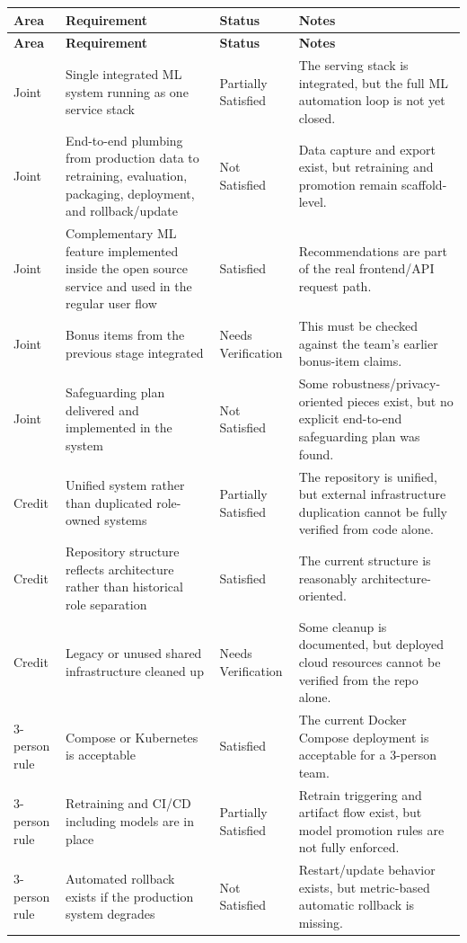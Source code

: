 \documentclass[11pt,a4paper]{article}
\begin{document}
\begin{longtable}{P{2.2cm}P{5.3cm}P{2.4cm}P{4.6cm}}
\toprule
\textbf{Area} & \textbf{Requirement} & \textbf{Status} & \textbf{Notes} \\
\midrule
\endfirsthead
\toprule
\textbf{Area} & \textbf{Requirement} & \textbf{Status} & \textbf{Notes} \\
\midrule
\endhead
Joint & Single integrated ML system running as one service stack & Partially Satisfied & The serving stack is integrated, but the full ML automation loop is not yet closed. \\
Joint & End-to-end plumbing from production data to retraining, evaluation, packaging, deployment, and rollback/update & Not Satisfied & Data capture and export exist, but retraining and promotion remain scaffold-level. \\
Joint & Complementary ML feature implemented inside the open source service and used in the regular user flow & Satisfied & Recommendations are part of the real frontend/API request path. \\
Joint & Bonus items from the previous stage integrated & Needs Verification & This must be checked against the team's earlier bonus-item claims. \\
Joint & Safeguarding plan delivered and implemented in the system & Not Satisfied & Some robustness/privacy-oriented pieces exist, but no explicit end-to-end safeguarding plan was found. \\
Credit & Unified system rather than duplicated role-owned systems & Partially Satisfied & The repository is unified, but external infrastructure duplication cannot be fully verified from code alone. \\
Credit & Repository structure reflects architecture rather than historical role separation & Satisfied & The current structure is reasonably architecture-oriented. \\
Credit & Legacy or unused shared infrastructure cleaned up & Needs Verification & Some cleanup is documented, but deployed cloud resources cannot be verified from the repo alone. \\
3-person rule & Compose or Kubernetes is acceptable & Satisfied & The current Docker Compose deployment is acceptable for a 3-person team. \\
3-person rule & Retraining and CI/CD including models are in place & Partially Satisfied & Retrain triggering and artifact flow exist, but model promotion rules are not fully enforced. \\
3-person rule & Automated rollback exists if the production system degrades & Not Satisfied & Restart/update behavior exists, but metric-based automatic rollback is missing. \\

\end{longtable}
\end{document}
